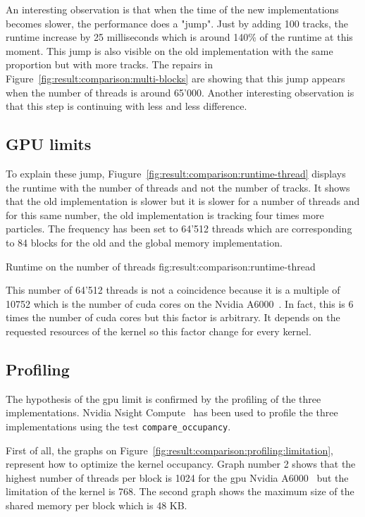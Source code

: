 An interesting observation is that when the time of the new implementations
becomes slower, the performance does a "jump".
Just by adding 100 tracks, the runtime increase by 25 milliseconds which is
around 140\% of the runtime at this moment.
This jump is also visible on the old implementation with the same proportion but
with more tracks.
The repairs in Figure~\ref{fig:result:comparison:multi-blocks} are showing that
this jump appears when the number of threads is around 65'000.
Another interesting observation is that this step is continuing with less and
less difference.

\subsection{GPU limits}
\label{ch:result:comparison:gpu}

To explain these jump, Fiugure~\ref{fig:result:comparison:runtime-thread}
displays the runtime with the number of threads and not the number of tracks.
It shows that the old implementation is slower but it is slower for a number of
threads and for this same number, the old implementation is tracking four times
more particles.
The frequency has been set to 64'512 threads which are corresponding to 84 blocks
for the old and the global memory implementation.

{Runtime on the number of threads}
{fig:result:comparison:runtime-thread}

This number of 64'512 threads is not a coincidence because it is a multiple of
10752 which is the number of \acrshort{cuda} cores on the Nvidia A6000~\cite{nvidia-a6000}.
In fact, this is 6 times the number of \acrshort{cuda} cores but this factor is
arbitrary.
It depends on the requested resources of the kernel so this factor change for
every kernel.

\subsection{Profiling}
\label{ch:result:comparison:profiling}

The hypothesis of the \acrshort{gpu} limit is confirmed by the profiling of the
three implementations.
Nvidia Nsight Compute~\cite{nsight-compute} has been used to profile the three
implementations using the test \texttt{compare\_occupancy}.

First of all, the graphs on Figure~\ref{fig:result:comparison:profiling:limitation},
represent how to optimize the kernel occupancy.
Graph number 2 shows that the highest number of threads per block is 1024
for the \acrshort{gpu} Nvidia A6000~\cite{nvidia-a6000} but the limitation of
the kernel is 768.
The second graph shows the maximum size of the shared memory per block which is
48 KB.

